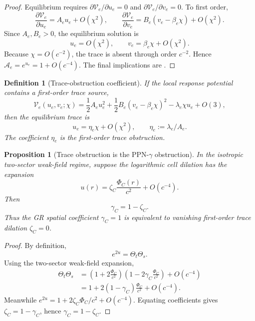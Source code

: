\documentclass[11pt]{article}
\newtheorem{proposition}[theorem]{Proposition}
\newtheorem{definition}[theorem]{Definition}
\theoremstyle{remark}
\begin{document}
\begin{proof}
Equilibrium requires \(\partial\mathcal V_e/\partial u_e=0\) and \(\partial\mathcal V_e/\partial v_e=0\).  To first order,
\[
        \frac{\partial\mathcal V_e}{\partial u_e}=A_eu_e+O(\chi^2),
        \qquad
        \frac{\partial\mathcal V_e}{\partial v_e}=B_e(v_e-\beta_e\chi)+O(\chi^2).
\]
Since \(A_e,B_e>0\), the equilibrium solution is
\[
        u_e=O(\chi^2),
        \qquad
        v_e=\beta_e\chi+O(\chi^2).
\]
Because \(\chi=O(c^{-2})\), the trace is absent through order \(c^{-2}\).  Hence \(\mathcal A_e=e^{u_e}=1+O(c^{-4})\).  The final implications are .
\end{proof}

\begin{definition}[Trace-obstruction coefficient]
\label{def:trace-obstruction-coefficient}
If the local response potential contains a first-order trace source,
\[
        \mathcal V_e(u_e,v_e;\chi)
        =
        \frac12 A_eu_e^2+\frac12 B_e(v_e-\beta_e\chi)^2
        -\lambda_e\chi u_e+O(3),
\]
then the equilibrium trace is
\[
        u_e=\eta_e\chi+O(\chi^2),
        \qquad
        \eta_e:=\lambda_e/A_e.
\]
The coefficient \(\eta_e\) is the first-order trace obstruction.
\end{definition}

\begin{proposition}[Trace obstruction is the PPN-\(\gamma\) obstruction]
\label{prop:trace-obstruction-gamma}
In the isotropic two-sector weak-field regime, suppose the logarithmic cell dilation has the expansion
\[
        u(r)=\zeta_C\frac{\Phi_C(r)}{c^2}+O(c^{-4}).
\]
Then
\[
        \gamma_C=1-\zeta_C.
\]
Thus the GR spatial coefficient \(\gamma_C=1\) is equivalent to vanishing first-order trace dilation \(\zeta_C=0\).
\end{proposition}

\begin{proof}
By definition,
\[
        e^{2u}=\Theta_t\Theta_s.
\]
Using the two-sector weak-field expansion,
\[
\begin{aligned}
        \Theta_t\Theta_s
        &=\left(1+2\frac{\Phi_C}{c^2}\right)
          \left(1-2\gamma_C\frac{\Phi_C}{c^2}\right)+O(c^{-4})\\
        &=1+2(1-\gamma_C)\frac{\Phi_C}{c^2}+O(c^{-4}).
\end{aligned}
\]
Meanwhile \(e^{2u}=1+2\zeta_C\Phi_C/c^2+O(c^{-4})\).  Equating coefficients gives \(\zeta_C=1-\gamma_C\), hence \(\gamma_C=1-\zeta_C\).
\end{proof}
\end{document}

